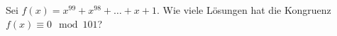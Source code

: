 
\begin{exercise}

Sei $f(x) = x^{99} + x^{98} + \dots + x + 1$.
Wie viele Lösungen hat die Kongruenz $f(x) \equiv 0 \mod{101}$?

\end{exercise}


\begin{solution}

\phantom{}

\end{solution}

